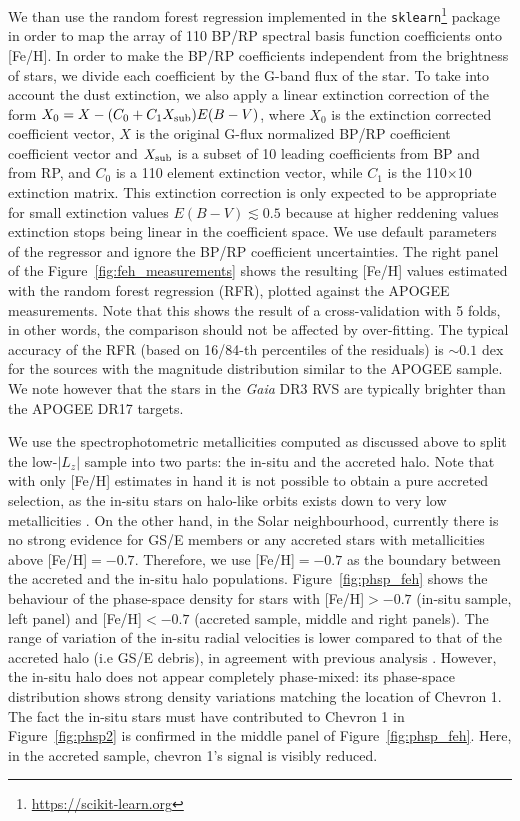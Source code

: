 \documentclass[a4paper,useAMS,usenatbib]{mnras}
\begin{document}
We than use the random forest regression implemented in the \texttt{sklearn}\footnote{\url{https://scikit-learn.org}} package in order to map the array of 110 BP/RP spectral basis function coefficients onto [Fe/H]. In order to make the BP/RP coefficients independent from the brightness of stars, we divide each coefficient by the G-band flux of the star. To take into account the dust extinction, we also apply a linear extinction correction of the form  $X_0 = X -(C_0 + C_1 X_{\rm sub}) E(B-V)$, where $X_0 $ is the extinction corrected coefficient vector, $X$ is the original G-flux normalized BP/RP coefficient coefficient vector and $X_{\rm sub}$ is a subset of 10 leading coefficients from BP and from RP, and $C_0$ is a 110 element extinction vector, while $C_1$ is the 110$\times$10 extinction matrix. This extinction correction is only expected to be appropriate for small extinction values $E(B-V)\lesssim 0.5$ because at higher reddening values extinction stops being linear in the coefficient space. We use default parameters of the regressor and ignore the BP/RP coefficient uncertainties.
The right panel of the Figure~\ref{fig:feh_measurements} shows the resulting [Fe/H] values estimated with the random forest regression (RFR), plotted against the APOGEE measurements. Note that this shows the result of a cross-validation with 5 folds, in other words, the comparison should not be affected by over-fitting. The typical accuracy of the RFR (based on 16/84-th percentiles of the residuals) is $\sim 0.1$ dex for the sources with the magnitude distribution similar to the APOGEE sample. We note however that the stars in the {\it Gaia} DR3 RVS are typically brighter than the APOGEE DR17 targets. 

We use the spectrophotometric metallicities computed as discussed above to split the low-$|L_z|$ sample into two parts: the in-situ and the accreted halo. Note that with only [Fe/H] estimates in hand it is not possible to obtain a pure accreted selection, as the in-situ stars on halo-like orbits exists down to very low metallicities \citep[see][]{Aurora,Conroy2022,Myeong2022}. On the other hand, in the Solar neighbourhood, currently there is no strong evidence for GS/E members or any accreted stars with metallicities above [Fe/H]$=-0.7$. Therefore, we use [Fe/H]$=-0.7$ as the boundary between the accreted and the in-situ halo populations. 
Figure~\ref{fig:phsp_feh} shows the behaviour of the phase-space density for stars with [Fe/H]$>-0.7$ (in-situ sample, left panel) and [Fe/H]$<-0.7$ (accreted sample, middle and right panels). The range of variation of the in-situ radial velocities is lower compared to that of the accreted halo (i.e GS/E debris), in agreement with previous analysis \citep[][]{Belokurov2020}. However, the in-situ halo does not appear completely phase-mixed: its phase-space distribution shows strong density variations matching the location of Chevron 1. The fact the in-situ stars must have contributed to Chevron 1 in Figure~\ref{fig:phsp2} is confirmed in the middle panel of Figure~\ref{fig:phsp_feh}. Here, in the accreted sample, chevron 1's signal is visibly reduced.
\end{document}
